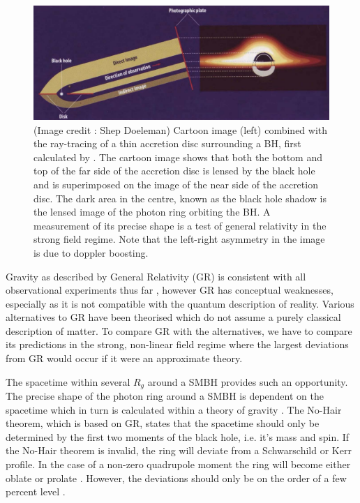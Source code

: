 {\begin{figure}[h!]
\includegraphics[width=\columnwidth]{Images/lensed_cartoon}
\caption{(Image credit : Shep Doeleman) Cartoon image (left) combined with the ray-tracing of a thin accretion disc surrounding a BH, first calculated by \citet{Luminet_1979}. The cartoon image shows that both the bottom and top of the far side of the accretion disc is lensed by the black hole and is superimposed on the image of the near side of the accretion disc. The dark area in the centre, known as the black hole shadow is the lensed image of the photon ring orbiting the BH. A measurement of its precise shape is a test of general relativity in the strong field regime. Note that the left-right asymmetry in the image is due to doppler boosting. \label{fig:grmhd}%
}
\end{figure}


Gravity as described by General Relativity (GR) is consistent with all observational experiments thus far \citep[e.g.][]{Kramer_2006}, however GR has conceptual weaknesses, especially as it is not compatible with the quantum description of reality. Various alternatives to GR have been theorised which do not assume a purely classical description of matter. To compare GR with the alternatives, we have to compare its predictions in the strong, non-linear field regime where the largest deviations from GR would occur if it were an approximate theory.


The spacetime within several $R_g$ around a SMBH provides such an opportunity. The precise shape of the photon ring around a SMBH is dependent on the spacetime which in turn is calculated within a theory of gravity \citep{Takahashi_2004}. The No-Hair theorem, which is based on GR, states that the spacetime should only be determined by the first two moments of the black hole, i.e. it's mass and spin. If the No-Hair theorem is invalid, the ring will deviate from a Schwarschild or Kerr profile. In the case of a non-zero quadrupole moment the ring will become either oblate or prolate \citep{Johannsen_2010}. However, the deviations should only be on the order of a few percent level \citep[e.g.][and references therein]{Goddi_2016}.

}

